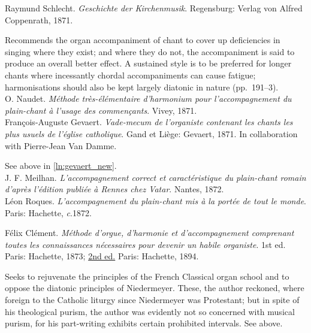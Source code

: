     \parindent=0pt
    \hangindent=0pt
  Raymund Schlecht. \emph{Geschichte der Kirchenmusik}. Regensburg:  Verlag von Alfred Coppenrath, 1871.

     \parindent=20pt
     \hangindent=20pt
     Recommends the organ accompaniment of chant to cover up deficiencies in singing where they exist; and where they do not, the accompaniment is said to produce an overall better effect. A sustained style is to be preferred for longer chants where incessantly chordal accompaniments can cause fatigue; harmonisations should also be kept largely diatonic in nature (pp.~191--3).\\

    \parindent=0pt
    \hangindent=0pt
  \covid{}O. Naudet. \emph{Méthode très-élémentaire d'harmonium pour l'accompagnement du plain-chant à l'usage des commençants}. Vivey, 1871. \\

    \parindent=0pt
    \hangindent=0pt
  François-Auguste Gevaert. \emph{Vade-mecum de l'organiste contenant les chants les plus usuels de l'église catholique}. Gand et Liège:  Gevaert, 1871. In collaboration with Pierre-Jean Van Damme.

     \parindent=20pt
     \hangindent=20pt
     See above in \cref{ln:gevaert_new}.\\

    \parindent=0pt
    \hangindent=0pt
  \covid{}J. F. Meilhan. \emph{L'accompagnement correct et caractéristique du plain-chant romain d'après l'édition publiée à Rennes chez Vatar}. Nantes, 1872. \\

    \parindent=0pt
    \hangindent=0pt
  \covid{}Léon Roques. \emph{L'accompagnement du plain-chant mis à la portée de tout le monde}. Paris:  Hachette, \emph{c}.1872. \\\pagebreak{}

    \parindent=0pt
    \hangindent=0pt
  Félix Clément. \emph{Méthode d'orgue, d'harmonie et d'accompagnement comprenant toutes les connaissances nécessaires pour devenir un habile organiste}. 1st ed. Paris:  Hachette, 1873;  \underline{2nd ed.} Paris:  Hachette, 1894.

     \parindent=20pt
     \hangindent=20pt
     Seeks to rejuvenate the principles of the French Classical organ school and to oppose the diatonic principles of Niedermeyer. These, the author reckoned, where foreign to the Catholic liturgy since Niedermeyer was Protestant; but in spite of his theological purism, the author was evidently not so concerned with musical purism, for his part-writing exhibits certain prohibited intervals. See  above.\\

